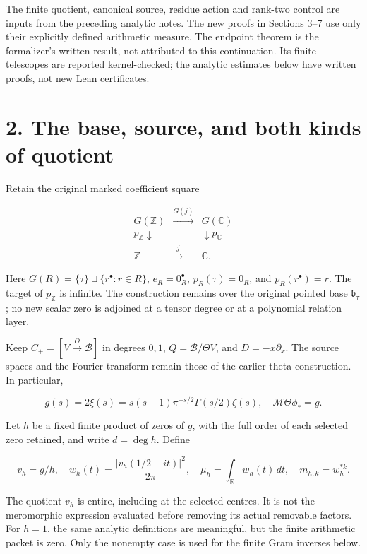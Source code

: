 The finite quotient, canonical source, residue action and rank-two
control are inputs from the preceding analytic notes. The new proofs in
Sections 3--7 use only their explicitly defined arithmetic measure. The
endpoint theorem is the formalizer's written result, not attributed to
this continuation. Its finite telescopes are reported kernel-checked;
the analytic estimates below have written proofs, not new Lean
certificates.

\section{2. The base, source, and both kinds of
quotient}\label{the-base-source-and-both-kinds-of-quotient}

Retain the original marked coefficient square

\[
\begin{array}{ccc}
 G(\mathbb Z)&\xrightarrow{G(j)}&G(\mathbb{C})\\
 p_{\mathbb Z}\downarrow&&\downarrow p_{\mathbb{C}}\\
 \mathbb Z&\xrightarrow{j}&\mathbb{C}.
\end{array}                                                          \tag{5}
\]

Here \(G(R)=\{\tau\}\sqcup\{r^\bullet:r\in R\}\), \(e_R=0_R^\bullet\),
\(p_R(\tau)=0_R\), and \(p_R(r^\bullet)=r\). The target of
\(p_{\mathbb Z}\) is infinite. The construction remains over the
original pointed base \(\mathfrak b_\tau\); no new scalar zero is
adjoined at a tensor degree or at a polynomial relation layer.

Keep \(C_+=[V\xrightarrow{\Theta}\mathscr B]\) in degrees \(0,1\),
\(Q=\mathscr B/\Theta V\), and \(D=-x\partial_x\). The source spaces and
the Fourier transform remain those of the earlier theta construction. In
particular,

\[
 g(s)=2\xi(s)=s(s-1)\pi^{-s/2}\Gamma(s/2)\zeta(s),\quad
 \mathcal M\Theta\phi_*=g.                                            \tag{6}
\]

Let \(h\) be a fixed finite product of zeros of \(g\), with the full
order of each selected zero retained, and write \(d=\deg h\). Define

\[
 v_h=g/h,\quad
 w_h(t)=\frac{|v_h(1/2+it)|^2}{2\pi},\quad
 \mu_h=\int_{\mathbb{R}}w_h(t)\,dt,\quad m_{h,k}=w_h^{*k}.               \tag{7}
\]

The quotient \(v_h\) is entire, including at the selected centres. It is
not the meromorphic expression evaluated before removing its actual
removable factors. For \(h=1\), the same analytic definitions are
meaningful, but the finite arithmetic packet is zero. Only the nonempty
case is used for the finite Gram inverses below.

